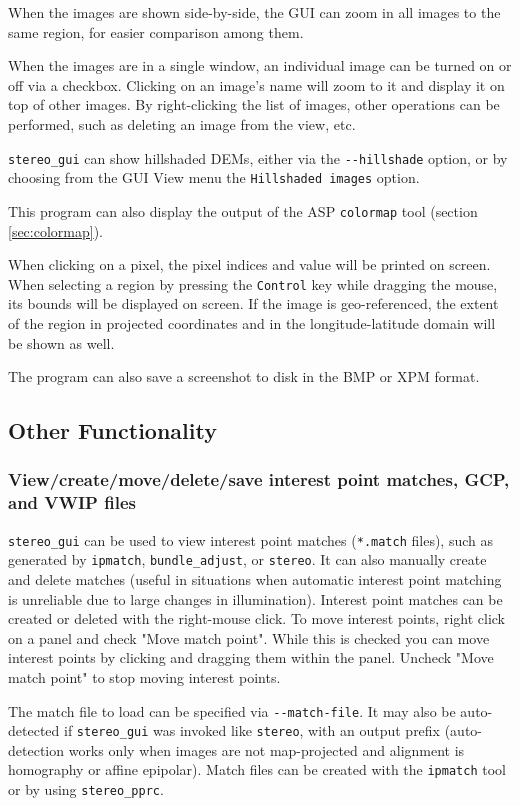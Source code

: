 When the images are shown side-by-side, the GUI can zoom
in all images to the same region, for easier comparison among them.

When the images are in a single window, an individual image can be turned
on or off via a checkbox. Clicking on an image's name will zoom to it
and display it on top of other images. By right-clicking the list
of images, other operations can be performed, such as deleting an image
from the view, etc. 

\texttt{stereo\_gui} can show hillshaded DEMs, either via the
\texttt{-\/-hillshade} option, or by choosing from the GUI View menu the
\texttt{Hillshaded images} option.

This program can also display the output of the ASP \texttt{colormap}
tool (section \ref{sec:colormap}).

When clicking on a pixel, the pixel indices and value will be printed on screen.
When selecting a region by pressing the \texttt{Control} key while dragging the mouse, 
its bounds will be displayed on screen. If the image is geo-referenced,
the extent of the region in projected coordinates and in the longitude-latitude domain 
will be shown as well. 

The program can also save a screenshot to disk in the BMP or XPM format. 

\subsection{Other Functionality}

\subsubsection{View/create/move/delete/save interest point matches, GCP, and VWIP files}

\texttt{stereo\_gui} can be used to view interest point matches
(\texttt{*.match} files), such as generated by \texttt{ipmatch},
\texttt{bundle\_adjust}, or \texttt{stereo}. It can also manually create
and delete matches (useful in situations when automatic interest point
matching is unreliable due to large changes in illumination). Interest
point matches can be created or deleted with the right-mouse click. To
move interest points, right click on a panel and check "Move match
point". While this is checked you can move interest points by clicking
and dragging them within the panel. Uncheck "Move match point" to stop
moving interest points.

The match file to load can be specified via \texttt{-\/-match-file}. It
may also be auto-detected if \texttt{stereo\_gui} was invoked like
\texttt{stereo}, with an output prefix (auto-detection works only when
images are not map-projected and alignment is homography or affine
epipolar).  Match files can be created with the \texttt{ipmatch} tool
or by using \texttt{stereo\_pprc}.

